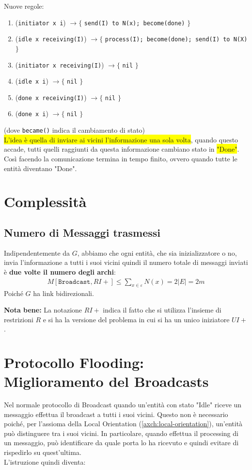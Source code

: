 Nuove regole:
\begin{enumerate}
    \item (\texttt{initiator x i}) $\rightarrow \lbrace$ \texttt{send(I) to N(x);
              become(done)} $\rbrace$
    \item (\texttt{idle x receiving(I)}) $\rightarrow \lbrace$ \texttt{process(I);
              become(done); send(I) to N(X)} $\rbrace$
    \item (\texttt{initiator x receiving(I)}) $\rightarrow \lbrace$ \texttt{nil}
          $\rbrace$
    \item (\texttt{idle x i}) $\rightarrow \lbrace$ \texttt{nil} $\rbrace$
    \item (\texttt{done x receiving(I)}) $\rightarrow \lbrace$ \texttt{nil}
          $\rbrace$
    \item (\texttt{done x i}) $\rightarrow \lbrace$ \texttt{nil} $\rbrace$
\end{enumerate}

(dove \verb|became()| indica il cambiamento di stato)\\

\colorbox{yellow}{L'idea è quella di inviare ai vicini l'informazione una sola
    volta}, quando questo accade, tutti quelli raggiunti da questa informazione
cambiano stato in \colorbox{yellow}{"Done"}. Così facendo la comunicazione
termina in tempo finito, ovvero quando tutte le entità diventano "Done".

\section{Complessità}
\subsection{Numero di Messaggi trasmessi}
Indipendentemente da $G$, abbiamo che ogni entità, che sia inizializzatore o no,
invia l'informazione a tutti i suoi vicini quindi il numero totale di messaggi
inviati è \textbf{due volte il numero degli archi}:
\begin{eqnarray}
    M[\texttt{Broadcast}, RI+]  \leq \sum_{x \in \varepsilon} N(x) = 2|E| = 2m
    \nonumber
\end{eqnarray}
Poiché $G$ ha link bidirezionali.

\textbf{Nota bene:} La notazione $RI+$ indica il fatto che si utilizza l'insieme
di restrizioni $R$ e si ha la versione del problema in cui si ha un unico
iniziatore $UI+$.

\section{Protocollo Flooding: Miglioramento del Broadcasts}
Nel normale protocollo di Broadcast quando un'entità con stato "Idle" riceve un
messaggio effettua il broadcast a tutti i suoi vicini. Questo non è necessario
poiché, per l'assioma della Local Orientation (\ref{axch:local-orientation}), un'entità può distinguere tra i
suoi vicini. In particolare, quando effettua il processing di un messaggio, può
identificare da quale porta lo ha ricevuto e quindi evitare di rispedirlo su
quest'ultima.\\
L'istruzione quindi diventa:

